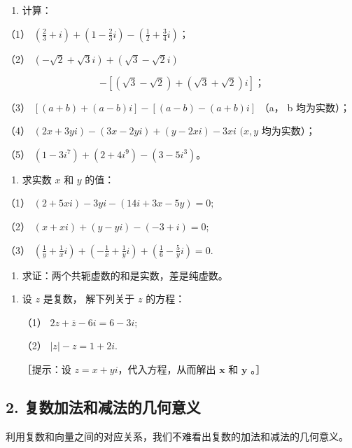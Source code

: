 \begin{enumerate}
\item
  计算：
\end{enumerate}

（1）
\(\left(\frac{2}{3} + i\right) + \left(1 - \frac{2}{3}i\right) - \left(\frac{1}{2} + \frac{3}{4}i\right)\)；

（2） \((- \sqrt{2} + \sqrt{3} i) + (\sqrt{3} - \sqrt{2} i)\)

\[
- \left[ (\sqrt {3} - \sqrt {2}) + (\sqrt {3} + \sqrt {2}) i \right]\text{；}
\]

（3） \(\left[(a + b) + (a - b)i\right] - [(a - b) - (a + b)i]\) （a， b
均为实数）；

（4） \((2x + 3yi) - (3x - 2yi) + (y - 2xi) - 3xi\) \((x, y\)
均为实数）；

（5） \((1 - 3i^{7}) + (2 + 4i^{9}) - (3 - 5i^{3})\)。

\begin{enumerate}[start=2]
\item
  求实数 \(x\) 和 \(y\) 的值：
\end{enumerate}

（1） \((2 + 5xi) - 3yi - (14i + 3x - 5y) = 0;\)

（2） \((x + xi) + (y - yi) - (-3 + i) = 0;\)

（3）
\(\left(\frac{1}{y} + \frac{1}{x} i\right) + \left(-\frac{1}{x} + \frac{1}{y} i\right) + \left(\frac{1}{6} - \frac{5}{y} i\right) = 0.\)

\begin{enumerate}[start=3]
\item
  求证：两个共轭虚数的和是实数，差是纯虚数。
\end{enumerate}

\begin{enumerate}[start=4,label={*\arabic*.}]
\item
  设 \(z\) 是复数， 解下列关于 \(z\) 的方程：

（1） \(2z + \overline{z} - 6i = 6 - 3i;\)

（2） \(|z| - z = 1 + 2i.\)

［提示：设 \(z = x + yi\)，代入方程，从而解出 \(\pmb{x}\) 和 \(\pmb{y}\)
。］

\end{enumerate}
\subsection{2. 复数加法和减法的几何意义}

利用复数和向量之间的对应关系，我们不难看出复数的加法和减法的几何意义。


